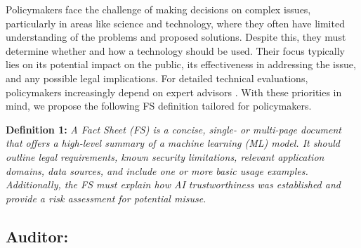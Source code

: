 \documentclass[manuscript,screen,review]{acmart}
\begin{document}
	Policymakers face the challenge of making decisions on complex issues, particularly in areas like science and technology, where they often have limited understanding of the problems and proposed solutions. Despite this, they must determine whether and how a technology should be used. Their focus typically lies on its potential impact on the public, its effectiveness in addressing the issue, and any possible legal implications. For detailed technical evaluations, policymakers increasingly depend on expert advisors \cite{thomas_expertise_2013}. With these priorities in mind, we propose the following FS definition tailored for policymakers.
	
	
	\textbf{Definition 1: }\textit{A Fact Sheet (FS) is a concise, single- or multi-page document that offers a high-level summary of a machine learning (ML) model. It should outline legal requirements, known security limitations, relevant application domains, data sources, and include one or more basic usage examples. Additionally, the FS must explain how AI trustworthiness was established and provide a risk assessment for potential misuse.}
	

\subsection{Auditor:}

	
\end{document}

